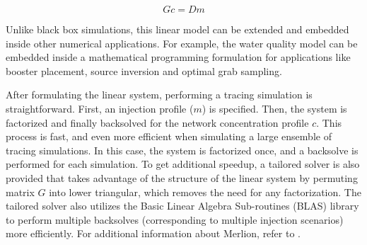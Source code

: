 \begin{equation}
Gc=Dm\label{eq:Merlion_Model}
\end{equation}


Unlike black box simulations, this linear model can be extended and
embedded inside other numerical applications. For example, the water quality model can be
embedded inside a mathematical programming formulation for applications
like booster placement, source inversion and optimal grab sampling. 

After formulating the linear system, performing a tracing simulation
is straightforward. First, an injection profile ($m$) is specified.
Then, the system is factorized and finally backsolved for the network
concentration profile $c$. This process is fast, and even more efficient
when simulating a large ensemble of tracing simulations. In this case,
the system is factorized once, and a backsolve is performed for each
simulation. To get additional speedup, a tailored solver is also provided
that takes advantage of the structure of the linear system by permuting
matrix $G$ into lower triangular, which removes the need for any
factorization. The tailored solver also utilizes the Basic Linear
Algebra Sub-routines (BLAS) library to perform multiple backsolves
(corresponding to multiple injection scenarios) more efficiently. 
For additional information about Merlion, refer to \citet{Merlion12}. 
